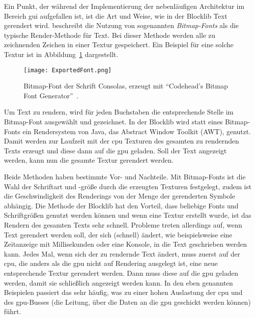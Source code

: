 Ein Punkt, der während der Implementierung der nebenläufigen Architektur im Bereich \ac{gui} aufgefallen ist, ist die Art und Weise, wie in der Blocklib Text gerendert wird. \textcite{Vries2020} beschreibt die Nutzung von sogenannten \emph{Bitmap-Fonts} als die typische Render-Methode für Text. Bei dieser Methode werden alle zu zeichnenden Zeichen in einer Textur gespeichert. Ein Beispiel für eine solche Textur ist in Abbildung~\ref{fig:bitmapfont} dargestellt.
\begin{figure}[!htbp]
	\centering
	\texttt{[image: ExportedFont.png]}
	\caption[Bitmap-Font der Schrift Consolas.]{Bitmap-Font der Schrift Consolas, erzeugt mit \enquote{Codehead's Bitmap Font Generator}~\cite{Codehead2015}.}\label{fig:bitmapfont}
\end{figure}
Um Text zu rendern, wird für jeden Buchstaben die entsprechende Stelle im Bitmap-Font ausgewählt und gezeichnet. In der Blocklib wird statt eines Bitmap-Fonts ein Rendersystem von Java, das Abstract Window Toolkit (AWT), genutzt. Damit werden zur Laufzeit mit der \ac{cpu} Texturen des gesamten zu rendernden Texts erzeugt und diese dann auf die \ac{gpu} geladen. Soll der Text angezeigt werden, kann nun die gesamte Textur gerendert werden.

Beide Methoden haben bestimmte Vor- und Nachteile. Mit Bitmap-Fonts ist die Wahl der Schriftart und -größe durch die erzeugten Texturen festgelegt, zudem ist die Geschwindigkeit des Renderings von der Menge der gerenderten Symbole abhängig. Die Methode der Blocklib hat den Vorteil, dass beliebige Fonts und Schriftgrößen genutzt werden können und wenn eine Textur erstellt wurde, ist das Rendern des gesamten Texts sehr schnell. Probleme treten allerdings auf, wenn Text gerendert werden soll, der sich (schnell) ändert, wie beispielsweise eine Zeitanzeige mit Millisekunden oder eine Konsole, in die Text geschrieben werden kann. Jedes Mal, wenn sich der zu rendernde Text ändert, muss zuerst auf der \ac{cpu}, die anders als die \ac{gpu} nicht auf Rendering ausgelegt ist, eine neue entsprechende Textur gerendert werden. Dann muss diese auf die \ac{gpu} geladen werden, damit sie schließlich angezeigt werden kann. In den eben genannten Beispielen passiert das sehr häufig, was zu einer hohen Auslastung der \ac{cpu} und des \ac{gpu}-Busses (die Leitung, über die Daten an die \ac{gpu} geschickt werden können) führt.

